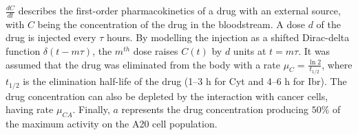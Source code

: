 \vspace{0.4cm}
$\frac{dC}{dt}$ describes the first-order pharmacokinetics of a drug with an external source, with $C$ being the concentration of the drug in the bloodstream. A dose $d$ of the drug is injected every $\tau$ hours. By modelling the injection as a shifted Dirac-delta function $\delta (t - m\tau)$, the $m^{th}$ dose raises $C(t)$ by $d$ units at $t=m\tau$. It was assumed that the drug was eliminated from the body with a rate $\mu_C = \frac{\ln 2}{t_{1/2}}$, where $t_{1/2}$ is the elimination half-life of the drug (1–3 h for Cyt and 4–6 h for Ibr). The drug concentration can also be depleted by the interaction with cancer cells, having rate $\mu_{CA}$. Finally, $a$ represents the drug concentration producing $50\%$ of the maximum activity on the A20 cell population. 
